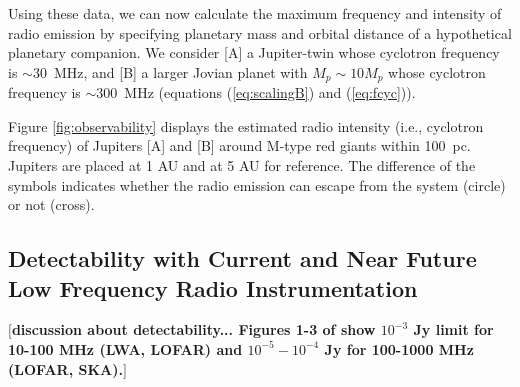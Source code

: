 \documentclass{emulateapj}
\def\memoYF#1{\color{red}$[${\bf #1}$]$ \color{black}}
\begin{document}
Using these data, we can now calculate the maximum frequency and intensity of radio emission by specifying planetary mass and orbital distance of a hypothetical planetary companion. 
We consider [A] a Jupiter-twin whose cyclotron frequency is $\sim 30$~MHz, and [B] a larger Jovian planet with $M_p\sim 10M_p$ whose cyclotron frequency is $\sim 300$~MHz (equations (\ref{eq:scalingB}) and (\ref{eq:fcyc})). 

Figure \ref{fig:observability} displays the estimated radio intensity (i.e., cyclotron frequency) of Jupiters [A] and [B] around M-type red giants within 100~pc. 
Jupiters are placed at 1 AU and at 5 AU for reference. 
The difference of the symbols indicates whether the radio emission can escape from the system (circle) or not (cross). 


\subsection{Detectability with Current and Near Future Low Frequency Radio Instrumentation}
\label{ss:detectability}


\memoYF{discussion about detectability... Figures 1-3 of \citet{griesmeier2007b} show $10^{-3}$ Jy limit for 10-100 MHz (LWA, LOFAR) and $10^{-5}-10^{-4}$ Jy for 100-1000 MHz (LOFAR, SKA).}
\end{document}

